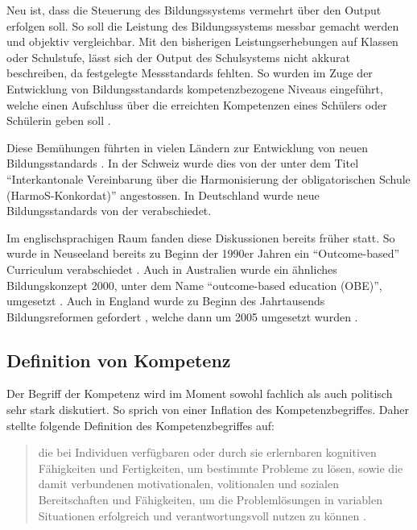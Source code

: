 Neu ist, dass die Steuerung des Bildungssystems vermehrt über den Output erfolgen soll. So soll die Leistung des Bildungssystems messbar gemacht werden und objektiv vergleichbar. Mit den bisherigen Leistungserhebungen auf Klassen oder Schulstufe, lässt sich der Output des Schulsystems nicht akkurat beschreiben, da festgelegte Messstandards fehlten. So wurden im Zuge der Entwicklung von Bildungsstandards kompetenzbezogene Niveaus eingeführt, welche einen Aufschluss über die erreichten Kompetenzen eines Schülers oder Schülerin geben soll \citep{Oelkers2008}.


Diese Bemühungen führten in vielen Ländern zur Entwicklung von neuen Bildungsstandards \citep{Berner2006}. In der Schweiz wurde dies von der \citet{EDKSchweizerKonfernezderKantonalenErziehungsdirektoren2004} unter dem Titel "`Interkantonale Vereinbarung über die Harmonisierung der obligatorischen Schule (HarmoS-Konkordat)"' angestossen. In Deutschland wurde neue Bildungsstandards von der \citet{Kultusministerkonferenz2004} verabschiedet.

Im englischsprachigen Raum fanden diese Diskussionen bereits früher statt. So wurde in Neuseeland bereits zu Beginn der 1990er Jahren ein "`Outcome-based"' Curriculum verabschiedet \citep{McGee1996}. Auch in Australien wurde ein ähnliches Bildungskonzept 2000,  unter dem Name "`outcome-based education (OBE)"', umgesetzt  \citep{Killen2000}. Auch in England wurde zu Beginn des Jahrtausends Bildungsreformen gefordert \citep{Millar1999}, welche dann um 2005 umgesetzt wurden \citep{Huber2006}.




\subsection{Definition von Kompetenz}

Der Begriff der Kompetenz wird im Moment sowohl fachlich als auch politisch sehr stark diskutiert. So sprich \citet{Weinert2001b} von einer Inflation des Kompetenzbegriffes.
Daher stellte \citet[S.27]{Weinert2001a} folgende Definition des Kompetenzbegriffes auf:

\begin{quote}
 die bei Individuen verfügbaren oder durch sie erlernbaren kognitiven Fähigkeiten und Fertigkeiten, um bestimmte Probleme zu lösen, sowie die damit verbundenen motivationalen, volitionalen und sozialen Bereitschaften und Fähigkeiten, um die Problemlösungen in variablen Situationen erfolgreich und verantwortungsvoll nutzen zu können \citep[S.27]{Weinert2001a}.
\end{quote}

